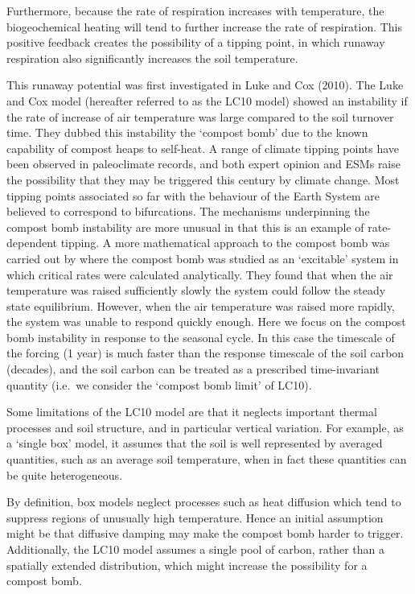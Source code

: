Furthermore, because the rate of respiration increases with temperature, the biogeochemical heating will tend to
further increase the rate of respiration. This positive feedback creates the possibility of a tipping point, in which
runaway respiration also significantly increases the soil temperature.

This runaway potential was first investigated in Luke and Cox (2010)\cite{Luke2011}. The Luke and Cox model (hereafter referred to as the LC10 model)
showed an instability if the rate of increase of air temperature was large compared to the soil turnover time. They dubbed this instability
the `compost bomb' due to the known capability of compost heaps to self-heat\cite{Nelson2007,Sidhu2007,Browne1929}. A range of climate tipping points have been observed in
paleoclimate records\cite{Alley2003}, and both expert opinion\cite{Lenton2008} and ESMs\cite{Drijfhout2015} raise the possibility that they may be triggered this century by climate change.
Most tipping points associated so far with the behaviour of the Earth System are believed to
correspond to bifurcations. The mechanisms underpinning the compost bomb instability are more unusual in that this is an example of rate-dependent tipping\cite{Ashwin2012}. A more mathematical
approach to the compost bomb was carried out by \cite{Wieczorek2011} where the compost bomb was studied as an `excitable' system in which critical rates were calculated analytically. They found that when the air temperature was
raised sufficiently slowly the system could follow the steady state equilibrium. However, when the air temperature was raised more rapidly,
the system was unable to respond quickly enough.
Here we focus on the compost bomb instability in response to the seasonal cycle. In this case the timescale of the forcing (1 year) is much faster than the response timescale of the soil carbon
(decades), and the soil carbon can be treated as a prescribed time-invariant quantity (i.e.\ we consider the `compost bomb limit' of LC10). 

Some limitations of the LC10 model are that it neglects important thermal processes and soil structure, and in particular vertical variation.
For example, as a `single box' model, it assumes that the soil is well represented by averaged quantities, such as an average soil temperature,
when in fact these quantities can be quite heterogeneous\cite{Gedney2003}.

By definition, box models neglect processes such as heat diffusion which tend to suppress regions of unusually high temperature. Hence an initial assumption might be
that diffusive damping may make the compost bomb harder to trigger. Additionally, the LC10 model assumes a single pool of carbon, rather than a spatially extended distribution, which might
increase the possibility for a compost bomb.

